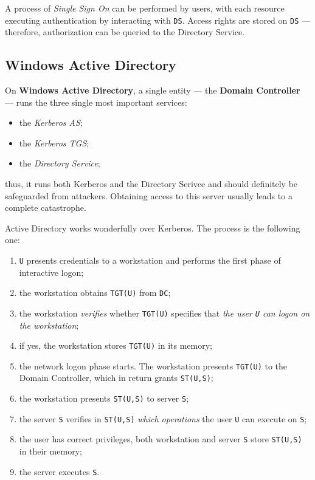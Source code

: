 \documentclass[10pt]{\classname}
\begin{document}
A process of \emph{Single Sign On} can be performed by users, with each
resource executing authentication by interacting with \texttt{DS}. Access
rights are stored on \texttt{DS} --- therefore, authorization can be queried to
the Directory Service.

\subsection{Windows Active Directory}

On \textbf{Windows Active Directory}, a single entity --- the \textbf{Domain
Controller} --- runs the three single most important services:
\begin{itemize}
    \item the \emph{Kerberos AS};
    \item the \emph{Kerberos TGS};
    \item the \emph{Directory Service};
\end{itemize}
thus, it runs both Kerberos and the Directory Serivce and should definitely be
safeguarded from attackers. Obtaining access to this server usually leads to a
complete catastrophe.

Active Directory works wonderfully over Kerberos. The process is the following
one:
\begin{enumerate}
    \item \texttt{U} presents credentials to a workstation and performs the
        first phase of interactive logon;
    \item the workstation obtains \texttt{TGT(U)} from \texttt{DC};
    \item the workstation \emph{verifies} whether \texttt{TGT(U)} specifies
        that \emph{the user \texttt{U} can logon on the workstation};
    \item if yes, the workstation stores \texttt{TGT(U)} in its memory;
    \item the network logon phase starts. The workstation presents
        \texttt{TGT(U)} to the Domain Controller, which in return grants
        \texttt{ST(U,S)};
    \item the workstation presents \texttt{ST(U,S)} to server \texttt{S};
    \item the server \texttt{S} verifies in \texttt{ST(U,S)} \emph{which
        operations} the user \texttt{U} can execute on \texttt{S};
    \item the user has correct privileges, both workstation and server
        \texttt{S} store \texttt{ST(U,S)} in their memory;
    \item the server executes \texttt{S}.
\end{enumerate}
\end{document}
